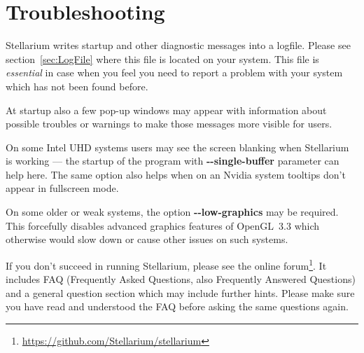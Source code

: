 \section{Troubleshooting}
\label{sec:GettingStarted:Running:Troubleshooting}

Stellarium writes startup and other diagnostic messages into a
logfile. Please see section~\ref{sec:LogFile} where this
file is located on your system. This file is \emph{essential} in case when
you feel you need to report a problem with your system which has not
been found before.

At startup also a few pop-up windows may appear
with information about possible troubles or warnings to make those
messages more visible for users.

On some Intel UHD systems %
users may see the screen blanking when Stellarium is working --- the startup of the program with \textbf{-\/-single-buffer} parameter can help here. 
The same option also helps when on an Nvidia system tooltips don't appear in fullscreen mode. 

On some older or weak systems, the option \textbf{-\/-low-graphics} may be required. 
This forcefully disables advanced graphics features of OpenGL~3.3 which otherwise would slow down or cause other issues on such systems.  

If you don't succeed in running Stellarium, please see the online
forum\footnote{\url{https://github.com/Stellarium/stellarium}}.  It includes
FAQ (Frequently Asked Questions, also Frequently Answered
Questions) and a general question section which may include
further hints. Please make sure you have read and understood the FAQ
before asking the same questions again.


